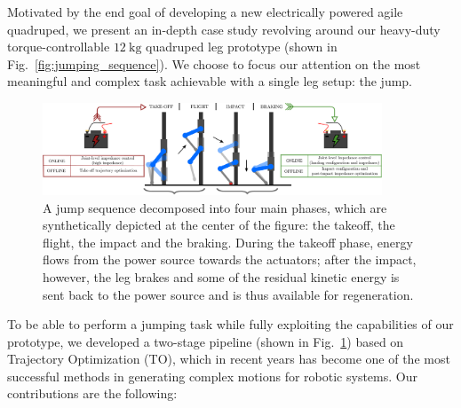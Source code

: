 Motivated by the end goal of developing a new electrically powered agile quadruped, we present an in-depth case study revolving around our heavy-duty torque-controllable $12~\mathrm{kg}$ quadruped leg prototype (shown in Fig.~\ref{fig:jumping_sequence}). We choose to focus our attention on the most meaningful and complex task achievable with a single leg setup: the jump. 
\begin{figure}[t]
    \centering
    \includegraphics[width=0.9\textwidth]{images/jump_phases_and_pipeline.pdf}
    \caption{A jump sequence decomposed into four main phases, which are synthetically depicted at the center of the figure: the takeoff, the flight, the impact and the braking. During the takeoff phase, energy flows from the power source towards the actuators; after the impact, however, the leg brakes and some of the residual kinetic energy is sent back to the power source and is thus available for regeneration. 
    }
    \label{fig:pipeline}
\end{figure}
To be able to perform a jumping task while fully exploiting the capabilities of our prototype, we developed a two-stage pipeline (shown in Fig.~\ref{fig:pipeline}) based on Trajectory Optimization (TO), which in recent years has become one of the most successful methods in generating complex motions for robotic systems\cite{agile_bots::nguyen2019optimized,agile_bots::chignoli2021humanoid, agile_bots::roscia2023orientation}.
Our contributions are the following:
